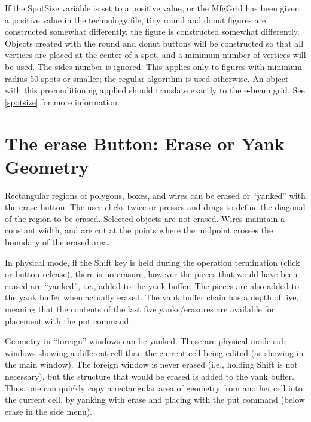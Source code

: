 If the {\et SpotSize} variable is set to a positive value, or the {\vt
MfgGrid} has been given a positive value in the technology file, tiny
round and donut figures are constructed somewhat differently.  the
figure is constructed somewhat differently.  Objects created with the
{\cb round} and {\cb donut} buttons will be constructed so that all
vertices are placed at the center of a spot, and a minimum number of
vertices will be used.  The {\cb sides} number is ignored.  This
applies only to figures with minimum radius 50 spots or smaller; the
regular algorithm is used otherwise.  An object with this
preconditioning applied should translate exactly to the e-beam grid. 
See \ref{spotsize} for more information.

\section{The {\cb erase} Button: Erase or Yank Geometry}

Rectangular regions of polygons, boxes, and wires can be erased or
``yanked'' with the {\cb erase} button.  The user clicks twice or
presses and drags to define the diagonal of the region to be erased. 
Selected objects are not erased.  Wires maintain a constant width, and
are cut at the points where the midpoint crosses the boundary of the
erased area.

In physical mode, if the {\kb Shift} key is held during the operation
termination (click or button release), there is no erasure, however
the pieces that would have been erased are ``yanked'', i.e., added to
the yank buffer.  The pieces are also added to the yank buffer when
actually erased.  The yank buffer chain has a depth of five, meaning
that the contents of the last five yanks/erasures are available for
placement with the {\cb put} command.

Geometry in ``foreign'' windows can be yanked.  These are
physical-mode sub-windows showing a different cell than the current
cell being edited (as showing in the main window).  The foreign window
is never erased (i.e., holding {\kb Shift} is not necessary), but the
structure that would be erased is added to the yank buffer.  Thus, one
can quickly copy a rectangular area of geometry from another cell into
the current cell, by yanking with {\cb erase} and placing with the
{\cb put} command (below {\cb erase} in the side menu).


